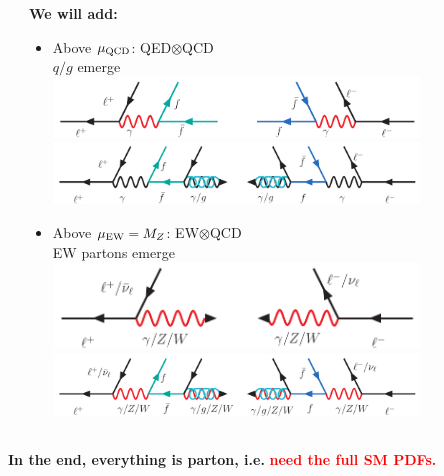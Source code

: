 \documentclass[aspectratio=169]{beamer}
\begin{document}
\begin{frame}
\begin{columns}
\begin{column}[t]{0.48\textwidth}
		\end{column}
		\begin{column}[t]{0.5\textwidth}
			\hspace{3mm}\vspace{1mm}\textcolor{PittRoyal}{\bf We will add: }\\
			\hspace{4mm}
			\begin{itemize}
				\item Above $\mu_{\rm QCD}$: QED$\otimes$QCD\\
				\textcolor{PittRoyal}{ $q/g$ emerge}\\
				\includegraphics[width=0.8\textwidth]{figs/qq_collision}
				\includegraphics[width=0.8\textwidth]{figs/gg_collision}
				\item Above $\mu_{\rm EW}= M_Z$: EW$\otimes$QCD\\
				\textcolor{PittRoyal}{EW partons emerge}
				\includegraphics[width=0.8\textwidth]{figs/EWA_collision}
				\includegraphics[width=0.8\textwidth]{figs/EW_collision}
			\end{itemize}
		\end{column}
	\end{columns}
	\vspace{1mm}\hspace{5mm}\textcolor{PittRoyal}{\bf In the end, everything is parton, i.e.} \textcolor{red}{\bf need the full SM PDFs. }
\end{frame}
\end{document}
